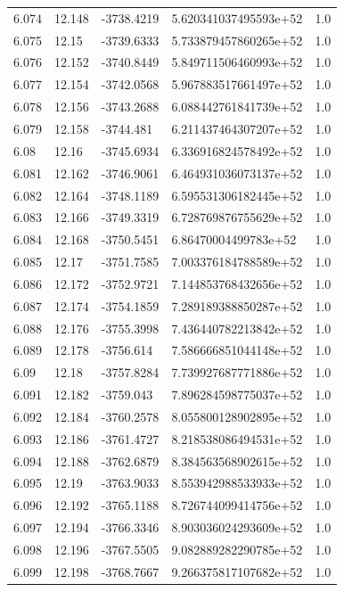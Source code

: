 \begin{tabular}{lllll}
6.074 & 12.148 & -3738.4219 & 5.620341037495593e+52 & 1.0 \\
6.075 & 12.15 & -3739.6333 & 5.733879457860265e+52 & 1.0 \\
6.076 & 12.152 & -3740.8449 & 5.849711506460993e+52 & 1.0 \\
6.077 & 12.154 & -3742.0568 & 5.967883517661497e+52 & 1.0 \\
6.078 & 12.156 & -3743.2688 & 6.088442761841739e+52 & 1.0 \\
6.079 & 12.158 & -3744.481 & 6.211437464307207e+52 & 1.0 \\
6.08 & 12.16 & -3745.6934 & 6.336916824578492e+52 & 1.0 \\
6.081 & 12.162 & -3746.9061 & 6.464931036073137e+52 & 1.0 \\
6.082 & 12.164 & -3748.1189 & 6.595531306182445e+52 & 1.0 \\
6.083 & 12.166 & -3749.3319 & 6.728769876755629e+52 & 1.0 \\
6.084 & 12.168 & -3750.5451 & 6.86470004499783e+52 & 1.0 \\
6.085 & 12.17 & -3751.7585 & 7.003376184788589e+52 & 1.0 \\
6.086 & 12.172 & -3752.9721 & 7.144853768432656e+52 & 1.0 \\
6.087 & 12.174 & -3754.1859 & 7.289189388850287e+52 & 1.0 \\
6.088 & 12.176 & -3755.3998 & 7.436440782213842e+52 & 1.0 \\
6.089 & 12.178 & -3756.614 & 7.586666851044148e+52 & 1.0 \\
6.09 & 12.18 & -3757.8284 & 7.739927687771886e+52 & 1.0 \\
6.091 & 12.182 & -3759.043 & 7.896284598775037e+52 & 1.0 \\
6.092 & 12.184 & -3760.2578 & 8.055800128902895e+52 & 1.0 \\
6.093 & 12.186 & -3761.4727 & 8.218538086494531e+52 & 1.0 \\
6.094 & 12.188 & -3762.6879 & 8.384563568902615e+52 & 1.0 \\
6.095 & 12.19 & -3763.9033 & 8.553942988533933e+52 & 1.0 \\
6.096 & 12.192 & -3765.1188 & 8.726744099414756e+52 & 1.0 \\
6.097 & 12.194 & -3766.3346 & 8.903036024293609e+52 & 1.0 \\
6.098 & 12.196 & -3767.5505 & 9.082889282290785e+52 & 1.0 \\
6.099 & 12.198 & -3768.7667 & 9.266375817107682e+52 & 1.0 \\

\end{tabular}

